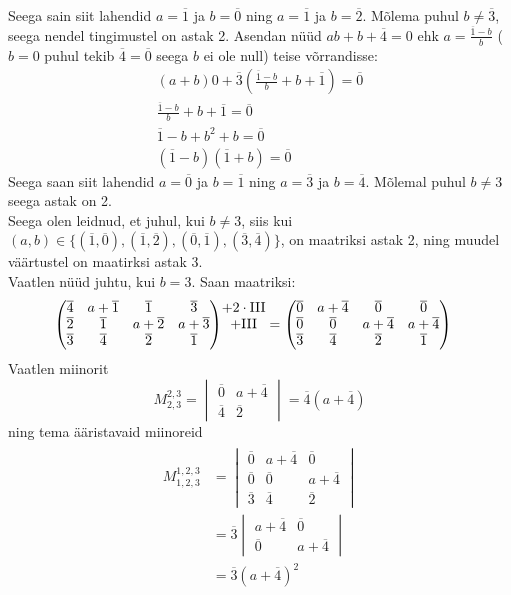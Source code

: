 \documentclass{article}
\newcommand\q[1]{\overline{#1}}
\begin{document}
Seega sain siit lahendid $a=\q{1}$ ja $b=\q{0}$ ning $a=\q{1}$ ja $b=\q{2}$. Mõlema puhul $b\neq\q{3}$, seega nendel tingimustel on astak 2. Asendan nüüd $ab+b+\q{4}=0$ ehk $a=\frac{\q{1}-b}{b}$ ($b=0$ puhul tekib $\q{4}=\q{0}$ seega $b$ ei ole null) teise võrrandisse:
\begin{gather*}
(a+b)0+\q{3}(\frac{\q{1}-b}{b}+b+\q{1})=\q{0}\\
\frac{\q{1}-b}{b}+b+\q{1}=\q{0}\\
\q{1}-b+b^2+b=\q{0}\\
(\q{1}-b)(\q{1}+b)=\q{0}
\end{gather*}
Seega saan siit lahendid $a=\q{0}$ ja $b=\q{1}$ ning $a=\q{3}$ ja $b=\q{4}$. Mõlemal puhul $b\neq3$ seega astak on 2.\\
Seega olen leidnud, et juhul, kui $b\neq3$, siis kui $(a,b)\in\{(\q{1},\q{0}),(\q{1},\q{2}),(\q{0},\q{1}),(\q{3},\q{4})\}$, on maatriksi astak 2, ning muudel väärtustel on maatirksi astak 3.\\
Vaatlen nüüd juhtu, kui $b=3$. Saan maatriksi:
\begin{align}
\begin{pmatrix}
\q{4} & a+\q{1} & \q{1} & \q{3}\\
\q{2} & \q{1} & a+\q{2} & a+\q{3}\\
\q{3} & \q{4} & \q{2} & \q{1}\notag
\end{pmatrix}&\begin{matrix}+2\cdot\text{III}\\+\text{III} \\ \\\end{matrix}=
\begin{pmatrix}
\q{0} & a+\q{4} & \q{0} & \q{0}\\
\q{0} & \q{0} & a+\q{4} & a+\q{4}\\
\q{3} & \q{4} & \q{2} & \q{1}\notag
\end{pmatrix}
\end{align}
Vaatlen miinorit $$M_{2,3}^{2,3}=\begin{vmatrix}\q{0} & a+\q{4}\\\q{4} & \q{2}\end{vmatrix}=\q{4}(a+\q{4})$$ning tema ääristavaid miinoreid
\begin{gather*}
\begin{aligned}
M_{1,2,3}^{1,2,3}&=\begin{vmatrix}\q{0} &a+\q{4} & \q{0}\\\q{0} & \q{0} & a+\q{4}\\\q{3} & \q{4} & \q{2}\end{vmatrix}\\
&=\q{3}\begin{vmatrix}a+\q{4} & \q{0}\\\q{0} & a+\q{4}\end{vmatrix}\\
&=\q{3}(a+\q{4})^2
\end{aligned}
\end{gather*}
\end{document}
